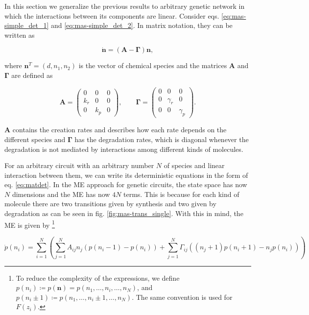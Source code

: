 In this section we generalize the previous results to arbitrary genetic network in which the interactions between its components are linear. Consider eqs. \eqref{eq:mas-simple_det_1} and \eqref{eq:mas-simple_det_2}. In matrix notation, they can be written as

\begin{equation}
  \label{eq:matdet}
  \mathbf{\dot{n}} = \left( \mathbf{A} - \mathbf{\Gamma} \right) \mathbf{n},
\end{equation}

where $\mathbf{n}^T=(d,n_1,n_2)$ is the vector of chemical species and the matrices $\mathbf{A}$ and $\mathbf{\Gamma}$ are defined as

\begin{equation}
  \label{eq:mas_G_single}
  \mathbf{A} =
  \begin{pmatrix}
    0 & 0 & 0 \\
    k_r & 0 & 0 \\
    0 & k_p & 0
  \end{pmatrix},\quad\quad
  \mathbf{\Gamma} =
  \begin{pmatrix}
    0 & 0 & 0 \\
    0 & \gamma_r & 0 \\
    0 & 0 & \gamma_p 
  \end{pmatrix}. 
\end{equation}

$\mathbf{A}$ contains the creation rates and describes how each rate depends on the different species and $\mathbf{\Gamma}$ has the degradation rates, which is diagonal whenever the degradation is not mediated by interactions among different kinds of molecules.

For an arbitrary circuit with an arbitrary number $N$ of species and linear interaction between them, we can write its deterministic equations in the form of eq. \eqref{eq:matdet}. In the ME approach for genetic circuits, the state space has now $N$ dimensions and the ME has now $4N$ terms. This is because for each kind of molecule there are two transitions given by synthesis and two given by degradation as can be seen in fig. \ref{fig:mas-trans_single}. With this in mind, the ME is given by \footnote{To reduce the complexity of the expressions, we define $p(n_i) \coloneqq p(\mathbf{n}) = p(n_1,\dotsc,n_i,\dotsc,n_N)$, and $p(n_i\pm1)\coloneqq p(n_1,\dotsc,n_i\pm1,\dotsc,n_N)$. The same convention is used for $F(z_i)$.}

\begin{equation}
  \label{eq:masterg1}
  \dot{p}(n_i) =  \sum_{i=1}^N\left(\sum_{j=1}^N A_{ij}n_j \left( p(n_i-1) - p(n_i) \right) + \sum_{j=1}^N \Gamma_{ij}((n_j+1)p(n_i+1)-n_jp(n_i))\right)
\end{equation}

